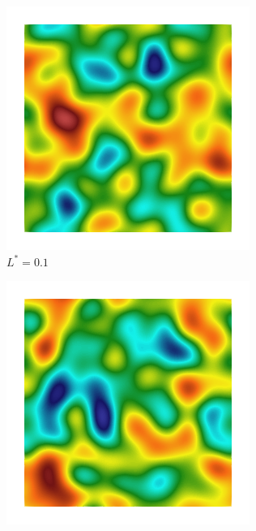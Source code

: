 \begin{figure}[!htbp]
  \begin{subfigure}[b]{0.15\textwidth}
    \includegraphics[width=\textwidth]{Chapter4/figures/2D/Gc_sqexp_cartesian_10_10_rho_0_seed_a.png}
    \caption{$L^* = 0.1$}
    \label{fig: Chapter4/2D/Gc_sqexp_cartesian_10_10_rho_0_seed_a}
  \end{subfigure}
  \begin{subfigure}[b]{0.15\textwidth}
    \includegraphics[width=\textwidth]{Chapter4/figures/2D/psic_sqexp_cartesian_10_10_rho_0_seed_a.png}

\end{subfigure}
\end{figure}
